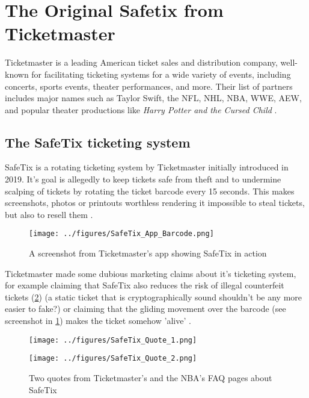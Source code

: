 \section{The Original Safetix from Ticketmaster}
Ticketmaster is a leading American ticket sales and distribution company, well-known for facilitating ticketing systems for a wide variety of events, 
including concerts, sports events, theater performances, and more. Their list of partners includes major names such as Taylor Swift, 
the NFL, NHL, NBA, WWE, AEW, and popular theater productions like \textit{Harry Potter and the Cursed Child} \cite{ticketmaster_wikipedia}. 

\subsection{The SafeTix ticketing system}
SafeTix is a rotating ticketing system by Ticketmaster initially introduced in 2019. It's goal is allegedly to keep tickets safe from theft and to undermine scalping of tickets by rotating the ticket barcode every 15 seconds. This makes screenshots, photos or printouts worthless rendering it impossible to steal tickets, but also to resell them \cite{introducing_safetix} \cite{ticketmaster_safetix_faq} \cite{nba_safetix_faq}. 

\begin{figure}[H]
    \begin{center}        
    \texttt{[image: ../figures/SafeTix\_App\_Barcode.png]}
    \caption{A screenshot from Ticketmaster's app showing SafeTix in action \cite{ticketmaster_mobile_ticketing}}
    \label{fig:app_barcode}
    \end{center}
\end{figure}

Ticketmaster made some dubious marketing claims about it's ticketing system, for example claiming that SafeTix also reduces the risk of illegal counterfeit tickets (\ref{fig:safetix_quotes}) (a static ticket that is cryptographically sound shouldn't be any more easier to fake?) or claiming that the gliding movement over the barcode (see screenshot in \ref{fig:app_barcode}) makes the ticket somehow 'alive' \cite{nba_safetix_faq} \cite{ticketmaster_safetix_faq}.

\begin{figure}[H]
    \begin{center}
        \texttt{[image: ../figures/SafeTix\_Quote\_1.png]}
    \end{center}
    \begin{center}
        \texttt{[image: ../figures/SafeTix\_Quote\_2.png]}
    \end{center}
    \caption{Two quotes from Ticketmaster's and the NBA's FAQ pages about SafeTix \cite{ticketmaster_safetix_faq} \cite{nba_safetix_faq}}
    \label{fig:safetix_quotes}
\end{figure}

